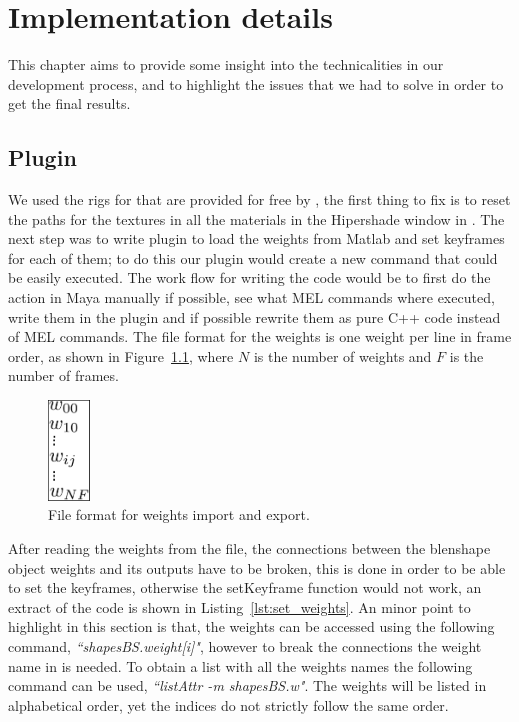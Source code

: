 \chapter{Implementation details}
\label{ch:implementation_details}

This chapter aims to provide some insight into the technicalities in our development process, and to highlight the issues that we had to solve in order to get the final results. 

\section{\Maya Plugin}

We used the rigs for \Maya that are provided for free by \cite{FaceWareRigsWeb}, the first thing to fix is to reset the paths for the textures in all the materials in the Hipershade window in \Maya.
The next step was to write plugin to load the weights from Matlab and set keyframes for each of them; to do this our plugin would create a new \Maya command that could be easily executed. 
The work flow for writing the code would be to first do the action in Maya manually if possible, see what MEL commands where executed, write them in the plugin and if possible rewrite them as pure C++ code instead of MEL commands.
The file format for the weights is one weight per line in frame order, as shown in Figure~\ref{fig:file_format}, where $N$ is the number of weights and $F$ is the number of frames.

\begin{figure}[htbp!]
\centering
\includegraphics[width=0.1\textwidth]{img/file_format}
	\caption{File format for weights import and export.}
	\label{fig:file_format}
\end{figure}

After reading the weights  from the file, the connections between the blenshape object weights and its outputs have to be broken, this is done in order to be able to set the keyframes, otherwise the setKeyframe function would not work, an extract of the code is shown in Listing~\ref{lst:set_weights}.
An minor point to highlight in this section is that, the weights can be accessed using the following command, \textit{``shapesBS.weight[i]"}, however to break the connections the weight name in \Maya is needed.
To obtain a list with all the weights names the following command can be used, \textit{``listAttr -m shapesBS.w"}.
The weights will be listed in alphabetical order, yet the indices do not strictly follow the same order. 


